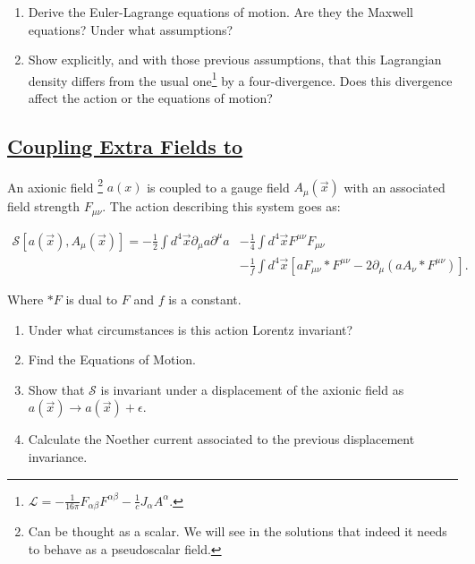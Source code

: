 \begin{enumerate}
	\item Derive the Euler-Lagrange equations of motion. Are they the Maxwell equations? Under what assumptions?
	\item Show explicitly, and with those previous assumptions, that this Lagrangian density differs from the usual one\footnote{$\mathcal{L}= -\frac{1}{16\pi} F_{\alpha\beta}F^{\alpha\beta} - \frac{1}{c}J_{\alpha}A^{\alpha}.$} by a four-divergence. Does this divergence affect the action or the equations of motion?
\end{enumerate}

\subsection{\hyperref[Coupling Extra Fields to amu]{Coupling Extra Fields to }}

An axionic field \footnote{Can be thought as a scalar. We will see in the solutions that indeed it needs to behave as a pseudoscalar field.} $a(x)$ is coupled to a gauge field $A_{\mu}(\vec{x})$ with an associated field strength $F_{\mu \nu}$. The action describing this system goes as:

\begin{equation}\label{axionicaction}
	\begin{split}
		\mathcal{S}[a(\vec{x}),A_{\mu}(\vec{x})]=
	-\frac{1}{2}\int d^{4}\vec{x}\partial_{\mu}a \partial^{\mu}a  &- \frac{1}{4}\int d^{4}\vec{x}F^{\mu\nu}F_{\mu\nu}\\
	 &- \frac{1}{f}\int d^{4}\vec{x}\left[a F_{\mu\nu}*F^{\mu\nu} - 2 \partial_{\mu}\left(a A_{\nu}*F^{\mu\nu}\right)\right].
	\end{split}
\end{equation}

Where $*F$ is dual to $F$ and $f$ is a constant.

\begin{enumerate}
	\item Under what circumstances is this action Lorentz invariant?
	\item Find the Equations of Motion.
	\item Show that $\mathcal{S}$ is invariant under a displacement of the axionic field as $a(\vec{x})\rightarrow a(\vec{x})+ \epsilon$.
	\item Calculate the Noether current associated to the previous displacement invariance.
\end{enumerate}

